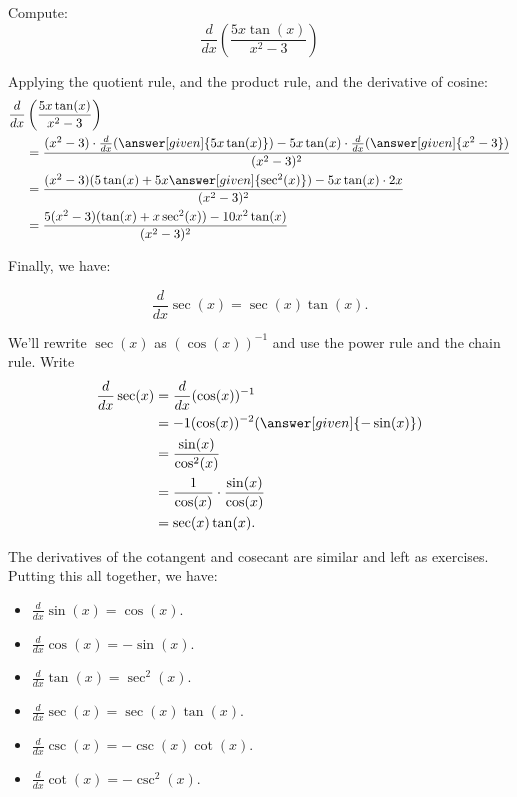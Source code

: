 \documentclass{ximera}
\begin{document}
\begin{example}
Compute:
\[
\frac{d}{dx} \left( \frac{5x \tan(x)}{x^2 - 3} \right)
\]
\begin{explanation}
Applying the quotient rule, and the product rule, and the derivative
of cosine:
\begin{align*}
  \frac{d}{dx} &\left( \frac{5x \tan(x)}{x^2 - 3} \right) \\
  &= \frac{(x^2 - 3) \cdot \frac{d}{dx}(\answer[given]{5x \tan(x)}) - 5x \tan(x) \cdot \frac{d}{dx} (\answer[given]{x^2 - 3})}{(x^2 - 3)^2}  \\
  &= \frac{(x^2 - 3)(5 \tan(x) + 5x \answer[given]{\sec^2(x)}) - 5x \tan(x) \cdot 2x}{(x^2 - 3)^2}  \\
  &= \frac{5(x^2-3)(\tan(x)+x \sec^2(x)) - 10x^2 \tan(x)}{(x^2-3)^2}
\end{align*}
\end{explanation}
\end{example}

Finally, we have:

\begin{theorem}
\[
\frac{d}{dx} \sec(x) = \sec(x)\tan(x).
\]


\begin{explanation}
We'll rewrite $\sec(x)$ as $(\cos(x))^{-1}$ and use the power rule and the chain rule. Write
\begin{align*}
\frac{d}{dx} \sec(x) &= \frac{d}{dx}(\cos (x))^{-1}\\
&=-1(\cos(x))^{-2}(\answer[given]{-\sin(x)}) \\
&= \frac{\sin(x)}{\cos^2(x)} \\
&= \frac{1}{\cos(x)} \cdot \frac{\sin(x)}{\cos(x)}  \\
&= \sec(x)\tan(x).
\end{align*}
\end{explanation}
\end{theorem}

The derivatives of the cotangent and cosecant are similar and left as
exercises.  Putting this all together, we have:

\begin{theorem} \hfil
\begin{itemize}
\item $\frac{d}{dx} \sin(x) = \cos(x)$.
\item $\frac{d}{dx} \cos(x) = -\sin(x)$.
\item $\frac{d}{dx} \tan(x) = \sec^2(x)$.
\item $\frac{d}{dx} \sec(x) = \sec(x)\tan(x)$.
\item $\frac{d}{dx} \csc(x) = -\csc(x)\cot(x)$.
\item $\frac{d}{dx} \cot(x) = -\csc^2(x)$.
\end{itemize}
\end{theorem}
\end{document}
